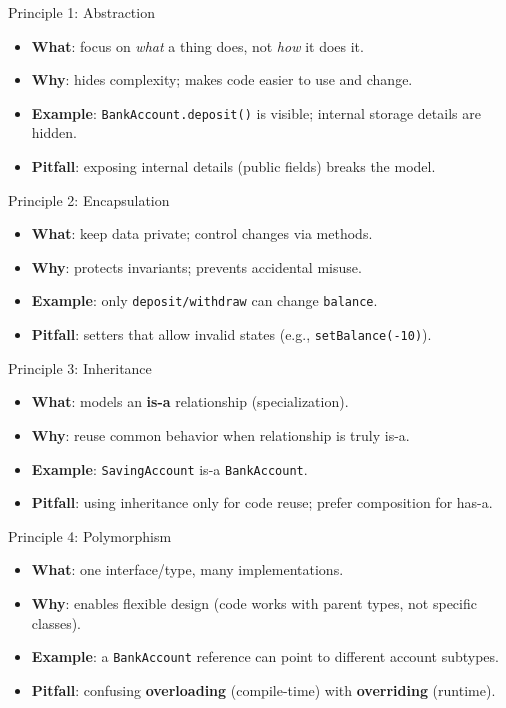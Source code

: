 \documentclass{beamer}
\begin{document}
\begin{frame}{Principle 1: Abstraction}
  \begin{itemize}[<+->]
    \item \textbf{What}: focus on \emph{what} a thing does, not \emph{how} it does it.
    \item \textbf{Why}: hides complexity; makes code easier to use and change.
    \item \textbf{Example}: \texttt{BankAccount.deposit()} is visible; internal storage details are hidden.
    \item \textbf{Pitfall}: exposing internal details (public fields) breaks the model.
  \end{itemize}
  \slidesources{\OOPSUnitISources}
\end{frame}

\begin{frame}{Principle 2: Encapsulation}
  \begin{itemize}[<+->]
    \item \textbf{What}: keep data private; control changes via methods.
    \item \textbf{Why}: protects invariants; prevents accidental misuse.
    \item \textbf{Example}: only \texttt{deposit/withdraw} can change \texttt{balance}.
    \item \textbf{Pitfall}: setters that allow invalid states (e.g., \texttt{setBalance(-10)}).
  \end{itemize}
  \slidesources{\OOPSUnitISources}
\end{frame}

\begin{frame}{Principle 3: Inheritance}
  \begin{itemize}[<+->]
    \item \textbf{What}: models an \textbf{is-a} relationship (specialization).
    \item \textbf{Why}: reuse common behavior when relationship is truly is-a.
    \item \textbf{Example}: \texttt{SavingAccount} is-a \texttt{BankAccount}.
    \item \textbf{Pitfall}: using inheritance only for code reuse; prefer composition for has-a.
  \end{itemize}
  \slidesources{\OOPSUnitISources}
\end{frame}

\begin{frame}{Principle 4: Polymorphism}
  \begin{itemize}[<+->]
    \item \textbf{What}: one interface/type, many implementations.
    \item \textbf{Why}: enables flexible design (code works with parent types, not specific classes).
    \item \textbf{Example}: a \texttt{BankAccount} reference can point to different account subtypes.
    \item \textbf{Pitfall}: confusing \textbf{overloading} (compile-time) with \textbf{overriding} (runtime).
  \end{itemize}
  \slidesources{\OOPSUnitISources}
\end{frame}
\end{document}
